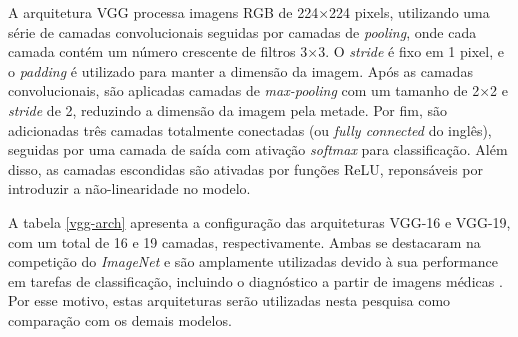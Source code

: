 A arquitetura VGG processa imagens RGB de 224×224 pixels, utilizando uma série de camadas convolucionais seguidas por camadas de \textit{pooling}, onde cada camada contém um número crescente de filtros 3×3. O \textit{stride} é fixo em 1 pixel, e o \textit{padding} é utilizado para manter a dimensão da imagem. Após as camadas convolucionais, são aplicadas camadas de \textit{max-pooling} com um tamanho de 2×2 e \textit{stride} de 2, reduzindo a dimensão da imagem pela metade. Por fim, são adicionadas três camadas totalmente conectadas (ou \textit{fully connected} do inglês), seguidas por uma camada de saída com ativação \textit{softmax} para classificação. Além disso, as camadas escondidas são ativadas por funções ReLU, reponsáveis por introduzir a não-linearidade no modelo.

A tabela \ref{vgg-arch} apresenta a configuração das arquiteturas VGG-16 e VGG-19, com um total de 16 e 19 camadas, respectivamente. Ambas se destacaram na competição do \textit{ImageNet} e são amplamente utilizadas devido à sua performance em tarefas de classificação, incluindo o diagnóstico a partir de imagens médicas \citep{Saini2023, Sitaula2021}. Por esse motivo, estas arquiteturas serão utilizadas nesta pesquisa como comparação com os demais modelos.

